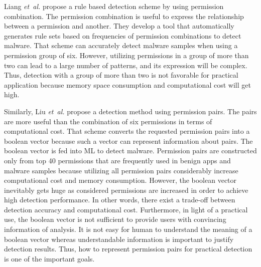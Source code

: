 \documentclass{ieeeaccess}
\newcommand{\etal}{\textit{et~al.}}
\begin{document}
Liang \etal \cite{liang2014permission} propose a rule based detection scheme by using permission combination.
The permission combination is useful to express the relationship between a permission and another.
They develop a tool that automatically generates rule sets based on frequencies of permission combinations to detect malware.
That scheme can accurately detect malware samples when using a permission group of six.
However, utilizing permissions in a group of more than two can lead to a large number of patterns, and its expression will be complex.
Thus, detection with a group of more than two is not favorable for practical application because memory space consumption and computational cost will get high.

Similarly, Liu \etal \cite{liu2014two} propose a detection method using permission pairs.
The pairs are more useful than the combination of six permissions in terms of computational cost.
That scheme converts the requested permission pairs into a boolean vector because such a vector can represent information about pairs.
The boolean vector is fed into ML to detect malware.
Permission pairs are constructed only from top 40 permissions that are frequently used in benign apps and malware samples because utilizing all permission pairs considerably increase computational cost and memory consumption.
However, the boolean vector inevitably gets huge as considered permissions are increased in order to achieve high detection performance.
In other words, there exist a trade-off between detection accuracy and computational cost.
Furthermore, in light of a practical use, the boolean vector is not sufficient to provide users with convincing information of analysis.
It is not easy for human to understand the meaning of a boolean vector whereas understandable information is important to justify detection results.
Thus, how to represent permission pairs for practical detection is one of the important goals.
\end{document}
